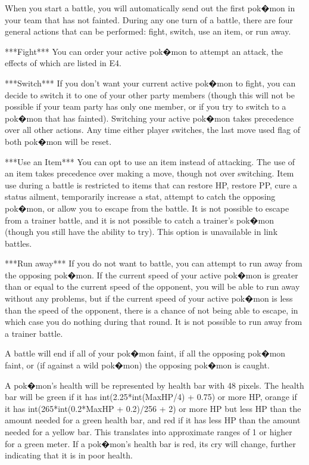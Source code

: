 \documentclass[reprint, aps, prl, paper=A4]{revtex4-1}
\begin{document}
When you start a battle, you will automatically send out the first pok�mon in your team that
has not fainted. During any one turn of a battle, there are four general actions that can be
performed: fight, switch, use an item, or run away.

***Fight***
You can order your active pok�mon to attempt an attack, the effects of which are listed in E4.

***Switch***
If you don't want your current active pok�mon to fight, you can decide to switch it to one of
your other party members (though this will not be possible if your team party has only one
member, or if you try to switch to a pok�mon that has fainted). Switching your active pok�mon
takes precedence over all other actions. Any time either player switches, the last move used
flag of both pok�mon will be reset.

***Use an Item***
You can opt to use an item instead of attacking. The use of an item takes precedence over
making a move, though not over switching. Item use during a battle is restricted to items that
can restore HP, restore PP, cure a status ailment, temporarily increase a stat, attempt to
catch the opposing pok�mon, or allow you to escape from the battle. It is not possible to
escape from a trainer battle, and it is not possible to catch a trainer's pok�mon (though you
still have the ability to try). This option is unavailable in link battles.

***Run away***
If you do not want to battle, you can attempt to run away from the opposing pok�mon. If the 
current speed of your active pok�mon is greater than or equal to the current speed of the
opponent, you will be able to run away without any problems, but if the current speed of your
active pok�mon is less than the speed of the opponent, there is a chance of not being able to
escape, in which case you do nothing during that round. It is not possible to run away from a
trainer battle.

A battle will end if all of your pok�mon faint, if all the opposing pok�mon faint, or (if
against a wild pok�mon) the opposing pok�mon is caught.

A pok�mon's health will be represented by health bar with 48 pixels. The health bar will be
green if it has int(2.25*int(MaxHP/4) + 0.75) or more HP, orange if it has
int(265*int(0.2*MaxHP + 0.2)/256 + 2) or more HP but less HP than the amount needed for a green
health bar, and red if it has less HP than the amount needed for a yellow bar. This translates
into approximate ranges of 1%
or higher for a green meter. If a pok�mon's health bar is red, its cry will change, further
indicating that it is in poor health.
\end{document}
